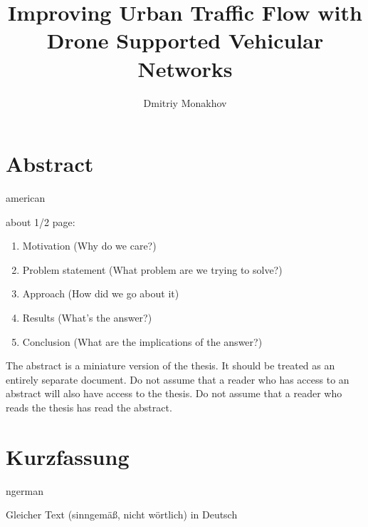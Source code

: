 \documentclass[]{nsm-thesis}
\author{Dmitriy Monakhov}
\title{Improving Urban Traffic Flow with Drone Supported Vehicular Networks}
\begin{document}

\maketitle

\cleardoublepage


\chapter*{Abstract}
\begin{otherlanguage*}{american}


about 1/2 page:
\begin{enumerate}
    \item Motivation (Why do we care?)
    \item Problem statement (What problem are we trying to solve?)
    \item Approach (How did we go about it)
    \item Results (What's the answer?)
    \item Conclusion (What are the implications of the answer?)
\end{enumerate}

The abstract is a miniature version of the thesis.
It should be treated as an entirely separate document.
Do not assume that a reader who has access to an abstract will also have access to the thesis.
Do not assume that a reader who reads the thesis has read the abstract.

\end{otherlanguage*}


\chapter*{Kurzfassung}
\begin{otherlanguage*}{ngerman}

Gleicher Text (sinngemäß, nicht wörtlich) in Deutsch

\end{otherlanguage*}
\acresetall

\cleardoublepage
\tableofcontents
{}

\cleardoublepage
{}
\end{document}
